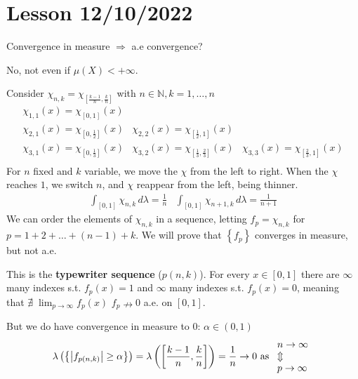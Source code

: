 \section{Lesson 12/10/2022}
\begin{remark}
    Convergence in measure \(\Rightarrow\) a.e convergence?

    No, not even if \(\mu(X) < +\infty\).

    Consider \(\chi_{n,k} = \chi_{[\frac{k-1}{n}, \frac{k}{n}]}\) with \(n \in \mathbb{N}, k = 1, \ldots, n\)
    \[
        \begin{array}{ccc}
            \chi_{1,1}(x) = \chi_{[0, 1]}(x) & & \\
            \chi_{2,1}(x) = \chi_{[0, \frac{1}{2}]}(x) & \chi_{2,2}(x) = \chi_{[\frac{1}{2}, 1]}(x) & \\
            \chi_{3,1}(x) = \chi_{[0, \frac{1}{3}]}(x) & \chi_{3,2}(x) = \chi_{[\frac{1}{3}, \frac{2}{3}]}(x) &\chi_{3,3}(x) = \chi_{[\frac{2}{3}, 1]}(x) \\
        \end{array}
    \]
    For \(n\) fixed and \(k\) variable, we move the \(\chi\) from the left to right. When the \(\chi\) reaches \(1\), we switch \(n\), and \(\chi\) reappear from the left, being thinner. 
    \[
        \begin{array}{cc}
            \int_{[0,1]} \chi_{n,k} \, d\lambda = \frac{1}{n} & \int_{[0,1]} \chi_{n+1, k} \, d\lambda = \frac{1}{n+1}
        \end{array}
    \]
    We can order the elements of \(\chi_{n,k}\) in a sequence, letting
    \(f_p = \chi_{n,k}\) for \(p=1+2+\ldots+(n-1)+k\). We will prove that \(\left\{ f_p \right\}\) converges in measure, but not a.e. 

    This is the \textbf{typewriter sequence} (\(p(n,k)\)). For every \(x \in [0,1]\) there are \(\infty\) many indexes s.t. \(f_p(x) = 1\) and \(\infty\) many indexes s.t. \(f_p(x) = 0\), meaning that \(\nexists \; \lim_{p\to \infty} f_p(x)\)
    \( f_p \nrightarrow 0 \) a.e. on \(\left[ 0, 1\right]\).

    But we do have convergence in measure to \(0\): \(\alpha \in (0,1)\)
    \[
        \lambda\left(\left\{ \abs{f_{p(n,k)}} \geq \alpha \right\}\right) = \lambda \left(\left[ \frac{k-1}{n}, \frac{k}{n} \right]\right) = \frac{1}{n} \to 0 \mbox{ as } \begin{array}{l}
            n\to \infty \\
            \Updownarrow \\
            p \to \infty        
        \end{array}
    \]
\end{remark}
